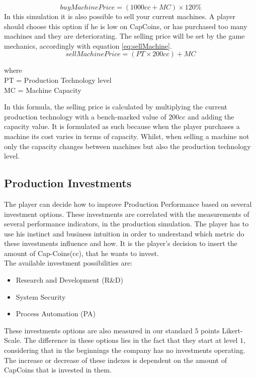 \begin{equation}
buyMachinePrice=(1000cc+MC)\times 120\%
\label{eq:buyMachine}
\end{equation}
In this simulation it is also possible to sell your current machines. A player should choose this option if he is low on CapCoins, or has purchased too many machines and they are deteriorating. The selling price will be set by the game mechanics, accordingly with equation \ref{eq:sellMachine}.
\begin{equation}
sellMachinePrice=(PT \times 200cc)+MC
\label{eq:sellMachine}
\end{equation}
\begin{center}
	where\\
	PT = Production Technology level \\
	MC = Machine Capacity
\end{center}
In this formula, the selling price is calculated by multiplying the current production technology with a bench-marked value of $200cc$ and adding the capacity value. It is formulated as such because when the player purchases a machine its cost varies in terms of capacity. Whilst, when selling a machine not only the capacity changes between machines but also the production technology level.

\subsection{Production Investments}
The player can decide how to improve Production Performance based on several investment options. These investments are correlated with the measurements of several performance indicators, in the production simulation. The player has to use his instinct and business intuition in order to understand which metric do these investments influence and how. It is the player's decision to insert the amount of Cap-Coins(cc), that he wants to invest. \\
The available investment possibilities are:
\begin{itemize}
\item Research and Development (R\&D)
\item System Security
\item Process Automation (PA)
\end{itemize}
These investments options are also measured in our standard $5$ points Likert-Scale. The difference in these options lies in the fact that they start at level $1$, considering that in the beginnings the company has no investments operating. The increase or decrease of these indexes is dependent on the amount of CapCoins that is invested in them.

